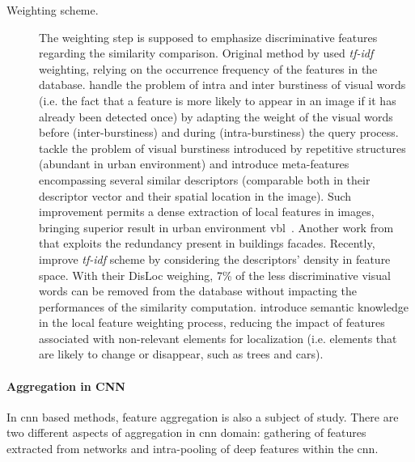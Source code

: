 \begin{description}
	\item[Weighting scheme.] The weighting step is supposed to emphasize discriminative features regarding the similarity comparison.	Original method by \citep{Sivic2003} used \textit{tf-idf} weighting, relying on the occurrence frequency of the features in the database. \citet{Jegou2009} handle the problem of intra and inter burstiness of visual words (i.e. the fact that a feature is more likely to appear in an image if it has already been detected once) by adapting the weight of the visual words before (inter-burstiness) and during (intra-burstiness) the query process. \citet{Torii2013} tackle the problem of visual burstiness introduced by repetitive structures (abundant in urban environment) and introduce meta-features encompassing several similar descriptors (comparable both in their descriptor vector and their spatial location in the image). Such improvement permits a dense extraction of local features in images, bringing superior result in urban environment \ac{vbl}~\citep{Qu2016,Torii2015}. Another work from \citet{Morago2016} that exploits the redundancy present in buildings facades. Recently, \citet{Arandjelovic2014} improve \textit{tf-idf} scheme by considering the descriptors' density in feature space. With their DisLoc weighing, 7\% of the less discriminative visual words can be removed from the database without impacting the performances of the similarity computation. \citet{Mousavian2015} introduce semantic knowledge in the local feature weighting process, reducing the impact of features associated with non-relevant elements for localization (i.e. elements that are likely to change or disappear, such as trees and cars).
\end{description}

\paragraph{Aggregation in CNN}

\label{subsubsec:cnn_aggregation}
In \ac{cnn} based methods, feature aggregation is also a subject of study. There are two different aspects of aggregation in \ac{cnn} domain: gathering of features extracted from networks and intra-pooling of deep features within the \ac{cnn}.

